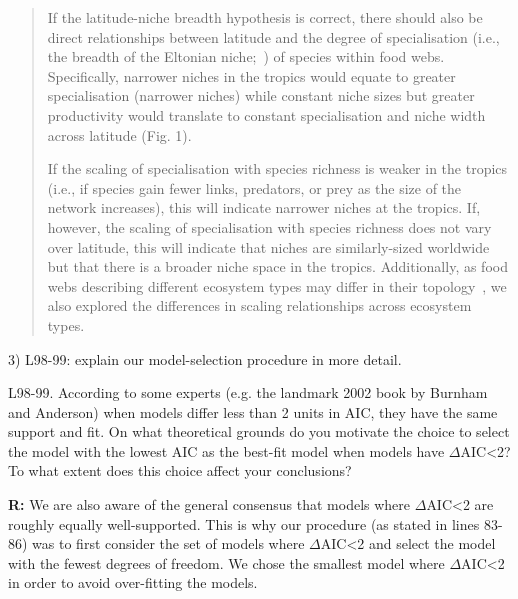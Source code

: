\documentclass[12pt]{letter}
\newenvironment{refquote}{\bigskip \begin{it}}{\end{it}\smallskip}
\begin{document}
  \begin{quotation}

    If the latitude-niche breadth hypothesis is correct, 
    there should also be direct relationships between 
    latitude and the degree of specialisation (i.e., the 
    breadth of the Eltonian 
    niche;~\cite{Elton1927,Leibold2010}) of species within
    food webs. Specifically, narrower niches in the tropics 
    would equate to greater specialisation (narrower niches) 
    while constant niche sizes but greater productivity 
    would translate to constant specialisation and niche 
    width across latitude (Fig. 1). 

    \smallskip

    If the scaling of specialisation with species richness 
    is weaker in the  tropics (i.e., if species gain fewer
    links, predators, or prey as the size  of the network
    increases), this will indicate narrower niches at the 
    tropics.  If, however, the scaling of specialisation 
    with species richness does not vary over latitude, this 
    will indicate that niches are similarly-sized worldwide 
    but that there is a broader niche space in the tropics. 
    Additionally, as food webs describing different 
    ecosystem types may differ in their 
    topology~\cite{Dunne2004,Shurin2006}, we also explored 
    the differences in scaling relationships across 
    ecosystem types.

  \end{quotation}


  3) L98-99: explain our model-selection procedure in more detail.

  \begin{refquote}

    L98-99. According to some experts (e.g. the landmark 2002 book by Burnham
    and Anderson) when models differ less than 2 units in AIC, they have the
    same support and fit. On what theoretical grounds do you motivate the
    choice to select the model with the lowest AIC as the best-fit model when
    models have $\Delta$AIC\textless2? To what extent does this choice affect your
    conclusions?

  \end{refquote}

  \textbf{R:} We are also aware of the general consensus    that models where
  $\Delta$AIC\textless2 are roughly equally well-supported. This is why our
  procedure (as stated in lines 83-86) was to first consider the set of models
  where $\Delta$AIC\textless2 and select the model with the fewest degrees of
  freedom. We chose the smallest model where $\Delta$AIC\textless2 in order to
  avoid over-fitting the models. 
\end{document}
